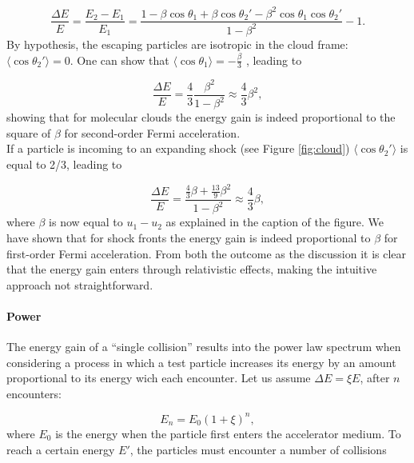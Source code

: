 \begin{equation}
\frac{\Delta E}{E} = \frac{E_2 -E_1}{E_1} = \frac{1 - 
\beta \cos \theta_1 + \beta \cos \theta_2' - \beta^2 \cos \theta_1 \cos \theta_2'}{1-\beta^2} -1.
\end{equation}
By hypothesis, the escaping particles are isotropic in the cloud frame: $\langle \cos \theta_2' \rangle = 0$. One can show that $\langle \cos \theta_1 \rangle = -\frac{\beta}{3}$ \cite{Gaisser:2016uoy}, leading to

\begin{equation}
\frac{\Delta E}{E} = \frac{4}{3} \frac{\beta^2}{1-\beta^2} \approx \frac{4}{3} \beta^2,
\end{equation}
showing that for molecular clouds the energy gain is indeed proportional to the square of $\beta$ for second-order Fermi acceleration.\\
\newline
If a particle is incoming to an expanding shock (see Figure \ref{fig:cloud}) $\langle \cos \theta_2'\rangle$ is equal to 2/3, leading to

\begin{equation}
\frac{\Delta E}{E} = \frac{\frac{4}{3}\beta + \frac{13}{9}\beta^2}{1-\beta^2} \approx \frac{4}{3} \beta,
\end{equation}
where $\beta$ is now equal to $u_1 -u_2$ as explained in the caption of the figure. We have shown that for shock fronts the energy gain is indeed proportional to $\beta$ for first-order Fermi acceleration. From both the outcome as the discussion it is clear that the energy gain enters through relativistic effects, making the intuitive approach not straightforward.

\paragraph{Power}
\label{para:power}
The energy gain of a ``single collision'' results into the power law spectrum when considering a process in which a test particle increases its energy by an amount proportional to its energy wich each encounter. Let us assume $\Delta E = \xi E$, after $n$ encounters:

\begin{equation}
E_n = E_0 \left(1+\xi\right)^n,
\end{equation}
where $E_0$ is the energy when the particle first enters the accelerator medium. To reach a certain energy $E'$, the particles must encounter a number of collisions

